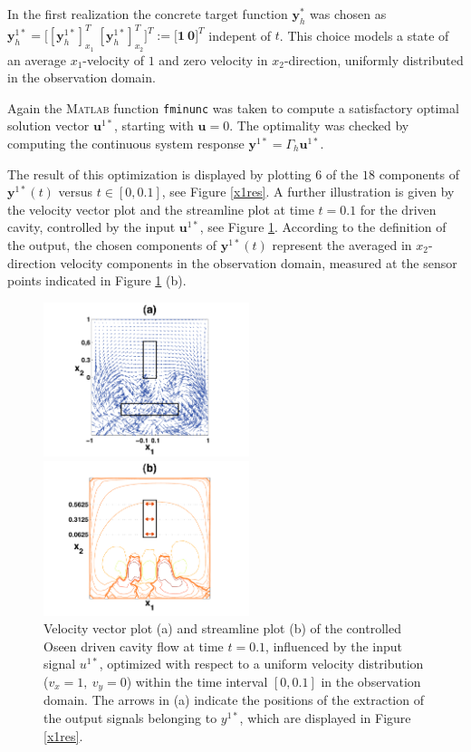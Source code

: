 \documentclass[a4paper,10pt,BCOR=15mm]{scrbook}
\begin{document}
In the first realization the concrete target function $\mathbf y_h^*$ was chosen as $\mathbf y_h^{1*} = \bigl [[\mathbf y_h^{1*}]_{x_1}^T~[\mathbf y_h^{1*}]_{x_2}^T \bigr ]^T := \bigl [ \mathbf 1 ~ \mathbf 0 \bigr ]^T$ indepent of $t$. This choice models a state of an average $x_1$-velocity of $1$ and zero velocity in $x_2$-direction, uniformly distributed in the observation domain.

Again the \textsc{Matlab} function \texttt{fminunc} was taken to compute a satisfactory optimal solution vector $\mathbf u^{1*}$, starting with $\mathbf u = 0$. The optimality was checked by computing the continuous system response $\mathbf y^{1*} =\Gamma_h \mathbf u^{1*}$.

The result of this optimization is displayed by plotting $6$ of the $18$ components of $\mathbf y^{1*}(t)$ versus $t\in [0,0.1]$, see Figure \ref{x1res}.  A further illustration is given by  the velocity vector plot and the streamline plot at time $t=0.1$ for the driven cavity, controlled by the input $\mathbf u^{1*}$, see Figure \ref{x1vest}. According to the definition of the output, the chosen components of $\mathbf y^{1*}(t)$ represent the averaged in $x_2$-direction velocity components in the observation domain, measured at the sensor points indicated in Figure \ref{x1vest} (b). 


\begin{figure}[htbp]
  \centering
  \begin{minipage}[b]{6 cm}
    \includegraphics[width=6cm]{pics/fullOpti/new/x1_vear.pdf}
  \end{minipage}
  \begin{minipage}[b]{6 cm}
    \includegraphics[width=6cm]{pics/fullOpti/new/x1_stli.pdf}
  \end{minipage}
   \caption{Velocity vector plot (a) and streamline plot (b) of the controlled Oseen driven cavity flow at time $t=0.1$, influenced by the input signal $u^{1*}$, optimized with respect to a uniform velocity distribution ($v_x = 1,~v_y=0$) within the time interval $[0,0.1]$ in the observation domain. The arrows in (a) indicate the positions of the extraction of the output signals belonging to $y^{1*}$, which are displayed in Figure \ref{x1res}.} 
\label{x1vest}
\end{figure}
\end{document}
